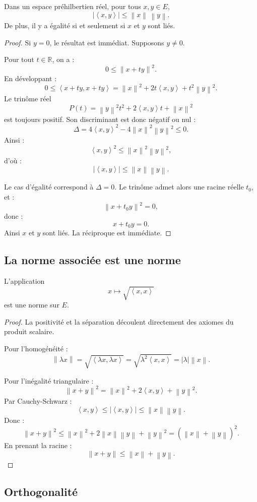 \documentclass[11pt,a4paper]{article}
\newcommand{\R}{\mathbb R}
\newcommand{\norme}[1]{\left\lVert #1 \right\rVert}
\newcommand{\scal}[2]{\left\langle #1,#2\right\rangle}
\begin{document}
\begin{theorembox}
Dans un espace préhilbertien réel, pour tous \(x,y\in E\),
\[
|\scal{x}{y}|\leq \norme{x}\,\norme{y}.
\]
De plus, il y a égalité si et seulement si \(x\) et \(y\) sont liés.
\end{theorembox}

\begin{proof}
Si \(y=0\), le résultat est immédiat. Supposons \(y\neq 0\).

Pour tout \(t\in\R\), on a :
\[
0\leq \norme{x+ty}^2.
\]
En développant :
\[
0\leq \scal{x+ty}{x+ty}
=\norme{x}^2+2t\scal{x}{y}+t^2\norme{y}^2.
\]
Le trinôme réel
\[
P(t)=\norme{y}^2t^2+2\scal{x}{y}t+\norme{x}^2
\]
est toujours positif. Son discriminant est donc négatif ou nul :
\[
\Delta=4\scal{x}{y}^2-4\norme{x}^2\norme{y}^2\leq 0.
\]
Ainsi :
\[
\scal{x}{y}^2\leq \norme{x}^2\norme{y}^2,
\]
d'où :
\[
|\scal{x}{y}|\leq \norme{x}\norme{y}.
\]

Le cas d'égalité correspond à \(\Delta=0\). Le trinôme admet alors une racine réelle \(t_0\), et :
\[
\norme{x+t_0y}^2=0,
\]
donc :
\[
x+t_0y=0.
\]
Ainsi \(x\) et \(y\) sont liés. La réciproque est immédiate.
\end{proof}

\subsection{La norme associée est une norme}

\begin{theorembox}
L'application
\[
x\mapsto \sqrt{\scal{x}{x}}
\]
est une norme sur \(E\).
\end{theorembox}

\begin{proof}
La positivité et la séparation découlent directement des axiomes du produit scalaire.

Pour l'homogénéité :
\[
\norme{\lambda x}
=\sqrt{\scal{\lambda x}{\lambda x}}
=\sqrt{\lambda^2\scal{x}{x}}
=|\lambda|\norme{x}.
\]

Pour l'inégalité triangulaire :
\[
\norme{x+y}^2
=\norme{x}^2+2\scal{x}{y}+\norme{y}^2.
\]
Par Cauchy-Schwarz :
\[
\scal{x}{y}\leq |\scal{x}{y}|
\leq \norme{x}\norme{y}.
\]
Donc :
\[
\norme{x+y}^2
\leq \norme{x}^2+2\norme{x}\norme{y}+\norme{y}^2
=(\norme{x}+\norme{y})^2.
\]
En prenant la racine :
\[
\norme{x+y}\leq \norme{x}+\norme{y}.
\]
\end{proof}

\subsection{Orthogonalité}
\end{document}
